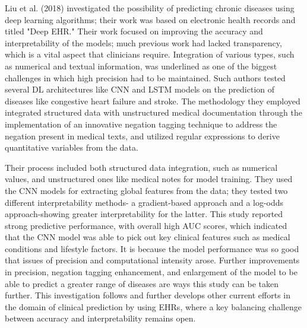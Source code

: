 \vspace{0.5cm}
Liu et al.\cite{pmlr-v85-liu18b} (2018) investigated the possibility of predicting chronic diseases using deep learning algorithms; their work was based on electronic health records and titled "Deep EHR." Their work focused on improving the accuracy and interpretability of the models; much previous work had lacked transparency, which is a vital aspect that clinicians require. Integration of various types, such as numerical and textual information, was underlined as one of the biggest challenges in which high precision had to be maintained. Such authors tested several DL architectures like CNN and LSTM models on the prediction of diseases like congestive heart failure and stroke. The methodology they employed integrated structured data with unstructured medical documentation through the implementation of an innovative negation tagging technique to address the negation present in medical texts, and utilized regular expressions to derive quantitative variables from the data.
 
\vspace{0.5cm}
Their process included both structured data integration, such as numerical values, and unstructured ones like medical notes for model training. They used the CNN models for extracting global features from the data; they tested two different interpretability methods- a gradient-based approach and a log-odds approach-showing greater interpretability for the latter. This study reported strong predictive performance, with overall high AUC scores, which indicated that the CNN model was able to pick out key clinical features such as medical conditions and lifestyle factors. It is because the model performance was so good that issues of precision and computational intensity arose. Further improvements in precision, negation tagging enhancement, and enlargement of the model to be able to predict a greater range of diseases are ways this study can be taken further. This investigation follows and further develops other current efforts in the domain of clinical prediction by using EHRs, where a key balancing challenge between accuracy and interpretability remains open.

 
\vspace{0.5cm}

